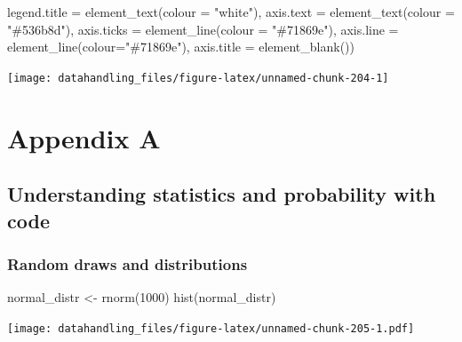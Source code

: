 \documentclass[
  12pt,
]{style/krantz}
\newenvironment{Shaded}{\begin{snugshade}}{\end{snugshade}}
\newcommand{\AttributeTok}[1]{\textcolor[rgb]{0.77,0.63,0.00}{#1}}
\newcommand{\DecValTok}[1]{\textcolor[rgb]{0.00,0.00,0.81}{#1}}
\newcommand{\FunctionTok}[1]{\textcolor[rgb]{0.00,0.00,0.00}{#1}}
\newcommand{\NormalTok}[1]{#1}
\newcommand{\OtherTok}[1]{\textcolor[rgb]{0.56,0.35,0.01}{#1}}
\newcommand{\StringTok}[1]{\textcolor[rgb]{0.31,0.60,0.02}{#1}}
\begin{document}
\begin{Shaded}
\begin{Highlighting}[]
        \AttributeTok{legend.title =} \FunctionTok{element\_text}\NormalTok{(}\AttributeTok{colour =} \StringTok{"white"}\NormalTok{),}
        \AttributeTok{axis.text =} \FunctionTok{element\_text}\NormalTok{(}\AttributeTok{colour =} \StringTok{"\#536b8d"}\NormalTok{),}
        \AttributeTok{axis.ticks =} \FunctionTok{element\_line}\NormalTok{(}\AttributeTok{colour =} \StringTok{"\#71869e"}\NormalTok{),}
        \AttributeTok{axis.line =} \FunctionTok{element\_line}\NormalTok{(}\AttributeTok{colour=}\StringTok{"\#71869e"}\NormalTok{),}
        \AttributeTok{axis.title =} \FunctionTok{element\_blank}\NormalTok{())}
\end{Highlighting}
\end{Shaded}

\texttt{[image: datahandling\_files/figure-latex/unnamed-chunk-204-1]}

\backmatter

\hypertarget{appendix-appendix}{%
\appendix {}}


\hypertarget{appendix-a}{%
\chapter{Appendix A}\label{appendix-a}}

\hypertarget{understanding-statistics-and-probability-with-code}{%
\section{Understanding statistics and probability with code}\label{understanding-statistics-and-probability-with-code}}

\hypertarget{random-draws-and-distributions}{%
\subsection{Random draws and distributions}\label{random-draws-and-distributions}}

\begin{Shaded}
\begin{Highlighting}[]
\NormalTok{normal\_distr }\OtherTok{\textless{}{-}} \FunctionTok{rnorm}\NormalTok{(}\DecValTok{1000}\NormalTok{)}
\FunctionTok{hist}\NormalTok{(normal\_distr)}
\end{Highlighting}
\end{Shaded}

\texttt{[image: datahandling\_files/figure-latex/unnamed-chunk-205-1.pdf]}
\end{document}
